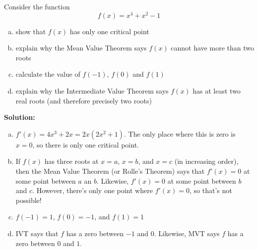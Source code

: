 \documentclass[11pt]{exam}
\theoremstyle{definition}
\begin{document}
\begin{questions}
\newpage
\question[7]
Consider the function
$$f(x) = x^4 +x^2-1$$
\begin{enumerate}[(a)]
\item show that $f(x)$ has only one critical point
\vspace{2in}
\item explain why the Mean Value Theorem says $f(x)$ cannot have more than two roots
\vspace{2in}
\item calculate the value of $f(-1)$, $f(0)$ and $f(1)$
\vspace{2in}
\item explain why the Intermediate Value Theorem says $f(x)$ has at least two real roots (and therefore precisely two roots)
\end{enumerate}
\textbf{Solution:}
\begin{enumerate}[(a)]
\item $f'(x) = 4x^3+2x = 2x(2x^2+1)$.  The only place where this is zero is $x=0$, so there is only one critical point.
\item If $f(x)$ has three roots at $x=a$, $x=b$, and $x=c$ (in increasing order), then the Mean Value Theorem (or Rolle's Theorem) says that $f'(x)=0$ at some point between $a$ an $b$.  Likewise, $f'(x) = 0$ at some point between $b$ and $c$.  However, there's only one point where $f'(x)=0$, so that's not possible!
\item $f(-1) = 1$, $f(0) = -1$, and $f(1) = 1$
\item IVT says that $f$ has a zero between $-1$ and $0$.  Likewise, MVT says $f$ has a zero between $0$ and $1$.
\end{enumerate}


\end{questions}
\end{document}
